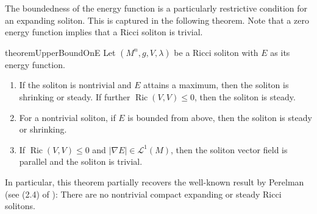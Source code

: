 \documentclass{amsart}
\newcommand{\abs}[1]{\left| #1 \right|}
\DeclareMathOperator*{\ricci}{Ric}
\theoremstyle{plain}
\theoremstyle{plain}
\theoremstyle{plain}
\theoremstyle{plain}
\theoremstyle{remark}
\begin{document}
The boundedness of the energy function is a particularly restrictive condition for an expanding soliton. This is captured in the following theorem.
Note that a zero energy function implies that a Ricci soliton is trivial.
\begin{restatable}{theorem}{UpperBoundOnE}
	\label{thm: Upper bound on E}
	Let $(M^n,g,V,\lambda)$ be a Ricci soliton with $E$ as its energy function.
	\begin{enumerate}
		\item If the soliton is nontrivial and $E$ attains a maximum, 
			then the soliton is shrinking or steady.
			If further $\ricci(V,V)\leq 0$, 
			then the soliton is steady.  
			\item For a nontrivial soliton, if $E$ is bounded from above, then the soliton is steady or shrinking.
		\item If $\ricci (V,V) \leq 0$ and $\abs{\nabla E}\in\mathcal{L}^1(M)$, 
			then the soliton vector field is parallel and the soliton is trivial. 
	\end{enumerate}
\end{restatable}
In particular, this theorem partially recovers the well-known result by Perelman (see (2.4) of \cite{perelman2002entropyformularicciflow}): There are no nontrivial compact expanding or steady Ricci solitons.
\end{document}
